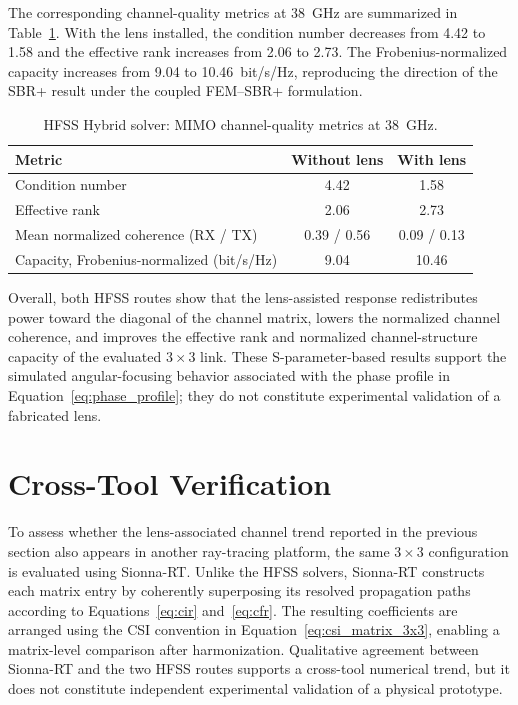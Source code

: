 The corresponding channel-quality metrics at 38~GHz are summarized in Table~\ref{table:hybrid_metrics}. With the lens installed, the condition number decreases from 4.42 to 1.58 and the effective rank increases from 2.06 to 2.73. The Frobenius-normalized capacity increases from 9.04 to 10.46~bit/s/Hz, reproducing the direction of the SBR+ result under the coupled FEM--SBR+ formulation.

\begin{table}[h!]
    \begin{center}
        \caption{HFSS Hybrid solver: MIMO channel-quality metrics at 38~GHz.}
        \label{table:hybrid_metrics}
        \begin{tabular}{|l|c|c|}
            \hline
            \textbf{Metric} & \textbf{Without lens} & \textbf{With lens} \\
            \hline
            Condition number & 4.42 & 1.58 \\
            Effective rank & 2.06 & 2.73 \\
            Mean normalized coherence (RX / TX) & 0.39 / 0.56 & 0.09 / 0.13 \\
            Capacity, Frobenius-normalized (bit/s/Hz) & 9.04 & 10.46 \\
            \hline
        \end{tabular}
    \end{center}
\end{table}

Overall, both HFSS routes show that the lens-assisted response redistributes power toward the diagonal of the channel matrix, lowers the normalized channel coherence, and improves the effective rank and normalized channel-structure capacity of the evaluated $3\times3$ link. These S-parameter-based results support the simulated angular-focusing behavior associated with the phase profile in Equation~\ref{eq:phase_profile}; they do not constitute experimental validation of a fabricated lens.


\section{Cross-Tool Verification}
To assess whether the lens-associated channel trend reported in the previous section also appears in another ray-tracing platform, the same $3\times3$ configuration is evaluated using Sionna-RT. Unlike the HFSS solvers, Sionna-RT constructs each matrix entry by coherently superposing its resolved propagation paths according to Equations~\ref{eq:cir} and~\ref{eq:cfr}. The resulting coefficients are arranged using the CSI convention in Equation~\ref{eq:csi_matrix_3x3}, enabling a matrix-level comparison after harmonization. Qualitative agreement between Sionna-RT and the two HFSS routes supports a cross-tool numerical trend, but it does not constitute independent experimental validation of a physical prototype.

